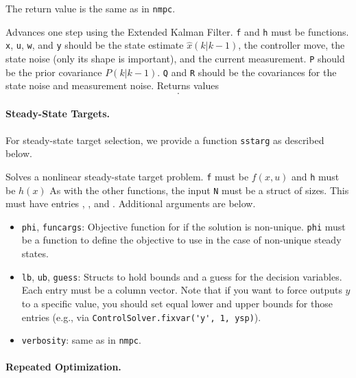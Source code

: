 \documentclass{article}
\begin{document}
\begin{multicols}{2}
The return value is the same as in \texttt{nmpc}.


Advances one step using the Extended Kalman Filter.
\texttt{f} and \texttt{h} must be \casadi{} functions.
\texttt{x}, \texttt{u}, \texttt{w}, and \texttt{y} should be the state estimate $\hat{x}(k|k-1)$, the controller move, the state noise (only its shape is important), and the current measurement.
\texttt{P} should be the prior covariance $P(k|k-1)$.
\texttt{Q} and \texttt{R} should be the covariances for the state noise and measurement noise.
Returns values
%
\begin{equation*}
    [P(k+1|k), \; \hat{x}(k+1|k), \; P(k|k), \; \hat{x}(k|k)].
\end{equation*}

\paragraph*{Steady-State Targets.}

For steady-state target selection, we provide a function \texttt{sstarg} as described below.


Solves a nonlinear steady-state target problem.
\texttt{f} must be $f(x,u)$ and \texttt{h} must be $h(x)$
As with the other functions, the input \texttt{N} must be a struct of sizes.
This must have entries \lstinline@x@, \lstinline@u@, and \lstinline@y@.
Additional arguments are below.

\begin{itemize}[noitemsep,nolistsep]
    \item \texttt{phi}, \texttt{funcargs}: Objective function for if the solution is non-unique.
    \texttt{phi} must be a \casadi{} function to define the objective to use in the case of non-unique steady states.
    \item \texttt{lb}, \texttt{ub}, \texttt{guess}: Structs to hold bounds and a guess for the decision variables.
    Each entry must be a column vector.
    Note that if you want to force outputs $y$ to a specific value, you should set equal lower and upper bounds for those entries (e.g., via \lstinline|ControlSolver.fixvar('y', 1, ysp)|).
    \item \texttt{verbosity}: same as in \texttt{nmpc}.
\end{itemize}

\paragraph*{Repeated Optimization.}


\end{multicols}
\end{document}
